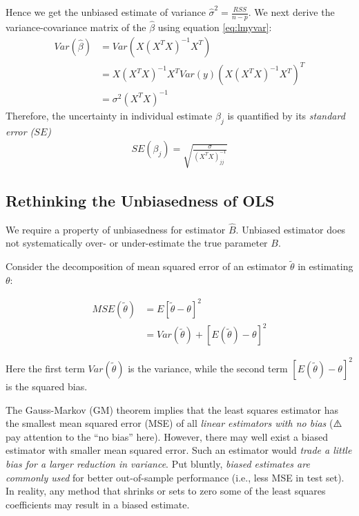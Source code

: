 \documentclass[
]{book}
\begin{document}
Hence we get the unbiased estimate of variance \(\hat{\sigma}^2 = \frac{RSS}{n-p}\). We next derive the variance-covariance matrix of the \(\hat{\beta}\) using equation \eqref{eq:lmyvar}:
\[
\begin{aligned}
Var( \hat{\beta}) &= Var( X(X^TX)^{-1} X^T ) \\&= X(X^TX)^{-1} X^T Var(y) (X(X^TX)^{-1} X^T)^T \\&=\sigma^2 (X^TX)^{-1}
\end{aligned}
\]
Therefore, the uncertainty in individual estimate \(\beta_j\) is quantified by its {\emph{standard error (\(SE\))}}
\[
\begin{aligned}
SE(\beta_j) = \sqrt{ \frac{\sigma}{ (X^TX)^{-1}_{jj} }}
\end{aligned}
\]

\hypertarget{rethinking-the-unbiasedness-of-ols}{%
\subsection{Rethinking the Unbiasedness of OLS}\label{rethinking-the-unbiasedness-of-ols}}

We require a property of unbiasedness for estimator \(\hat{B}\). Unbiased estimator does not systematically over- or under-estimate the true parameter \(B\).

Consider the decomposition of mean squared error of an estimator \(\tilde{\theta}\) in estimating \(\theta\):

\[
\begin{aligned}
MSE(\tilde{\theta}) &= E[ \tilde{\theta} - \theta ]^2 \\
                    &= Var( \tilde{\theta} ) +  [E( \tilde{\theta} ) - \theta ]^2
\end{aligned}
\]

Here the first term \(Var( \tilde{\theta} )\) is the variance, while the second term \([E( \tilde{\theta} ) - \theta ]^2\) is the squared bias.

The Gauss-Markov (GM) theorem implies that the least squares estimator has the smallest mean squared error (MSE) of all {\emph{linear estimators with no bias}} (⚠️ pay attention to the ``no bias'' here). However, there may well exist a biased estimator with smaller mean squared error. Such an estimator would {\emph{trade a little bias for a larger reduction in variance}}. Put bluntly, {\emph{biased estimates are commonly used}} for better out-of-sample performance (i.e., less MSE in test set). In reality, any method that shrinks or sets to zero some of the least squares coefficients may result in a biased estimate.
\end{document}
